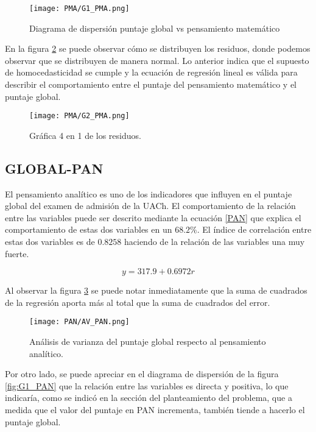 \documentclass{article}
\begin{document}
\begin{figure}[H]
    \centering
    \texttt{[image: PMA/G1\_PMA.png]}
    \caption{Diagrama de dispersión puntaje global vs pensamiento matemático}
    \label{fig:G1_PMA}
\end{figure}

En la figura \ref{fig:G2_PMA} se puede observar cómo se distribuyen los residuos, donde podemos observar que se distribuyen de manera normal. Lo anterior indica que el supuesto de homocedasticidad se cumple y la ecuación de regresión lineal es válida para describir el comportamiento entre el puntaje del pensamiento matemático y el puntaje global.

\begin{figure}[H]
    \centering
    \texttt{[image: PMA/G2\_PMA.png]}
    \caption{Gráfica 4 en 1 de los residuos.}
    \label{fig:G2_PMA}
\end{figure}

\subsection{GLOBAL-PAN}

El pensamiento analítico es uno de los indicadores que influyen en el puntaje global del examen de admisión de la UACh. El comportamiento de la relación entre las variables puede ser descrito mediante la ecuación \ref{PAN} que explica el comportamiento de estas dos variables en un $68.2\%$. El índice de correlación entre estas dos variables es de $0.8258$ haciendo de la relación de las variables una muy fuerte.

\begin{equation}
    y = 317.9 + 0.6972r
    \label{PAN}
\end{equation}

Al observar la figura \ref{fig:AV_PAN} se puede notar inmediatamente que la suma de cuadrados de la regresión aporta más al total que la suma de cuadrados del error.

\begin{figure}[H]
    \centering
    \texttt{[image: PAN/AV\_PAN.png]}
    \caption{Análisis de varianza del puntaje global respecto al pensamiento analítico.}
    \label{fig:AV_PAN}
\end{figure}

Por otro lado, se puede apreciar en el diagrama de dispersión de la figura \ref{fig:G1_PAN} que la relación entre las variables es directa y positiva, lo que indicaría, como se indicó en la sección del planteamiento del problema, que a medida que el valor del puntaje en PAN incrementa, también tiende a hacerlo el puntaje global.
\end{document}
